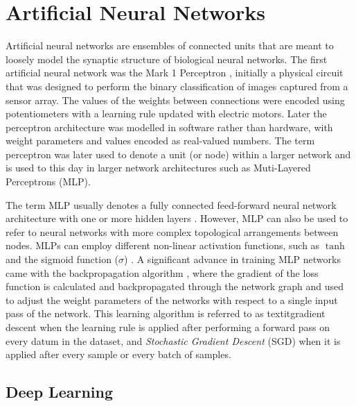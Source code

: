 \section{Artificial Neural Networks}

Artificial neural networks are ensembles of connected units that are meant to loosely model the synaptic structure of biological neural networks. 
The first artificial neural network was the Mark 1 Perceptron \citep{rosenblatt1958perceptron}, initially a physical circuit that was designed to perform the binary classification of images captured from a sensor array. 
The values of the weights between connections were encoded using potentiometers with a learning rule updated with electric motors. 
Later the perceptron architecture was modelled in software rather than hardware, with weight parameters and values encoded as real-valued numbers. 
The term perceptron was later used to denote a unit (or node) within a larger network and is used to this day in larger network architectures such as Muti-Layered Perceptrons (MLP).

The term MLP usually denotes a fully connected feed-forward neural network architecture with one or more hidden layers \citep{rosenblatt1958perceptron}. 
However, MLP can also be used to refer to neural networks with more complex topological arrangements between nodes. 
MLPs can employ different non-linear activation functions, such as $\tanh$ \citep{kalman1992tanh} and the sigmoid function ($\sigma$) \citep{han1995influence}.
A significant advance in training MLP networks came with the backpropagation algorithm \citep{werbos1974beyond}, where the gradient of the loss function is calculated and backpropagated through the network graph and used to adjust the weight parameters of the networks with respect to a single input pass of the network. 
This learning algorithm is referred to as textit{gradient descent} when the learning rule is applied after performing a forward pass on every datum in the dataset, and \textit{Stochastic Gradient Descent} (SGD) when it is applied after every sample or every batch of samples. 

\subsection{Deep Learning}

